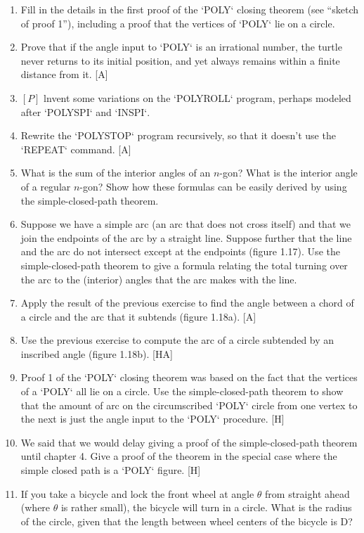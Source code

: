 \documentclass{book}
\begin{document}
\begin{enumerate}
\item Fill in the details in the first proof of the \textsc{`POLY`} closing theorem (see
``sketch of proof 1''), including a proof that the vertices of \textsc{`POLY`} lie on a
circle.  
\item Prove that if the angle input to \textsc{`POLY`} is an irrational number, the
turtle never returns to its initial position, and yet always remains within
a finite distance from it. [A]
\item $[P]$ lnvent some variations on the \textsc{`POLYROLL`} program, perhaps modeled
after \textsc{`POLYSPI`} and \textsc{`INSPI`}.
\item Rewrite the \textsc{`POLYSTOP`} program recursively, so that it doesn't use the
\textsc{`REPEAT`} command. [A]
\item What is the sum of the interior angles of an $n$-gon? What is the
interior angle of a regular $n$-gon? Show how these formulas can be easily
derived by using the simple-closed-path theorem.  
\item Suppose we have a simple arc (an arc that does not cross itself) and
that we join the endpoints of the arc by a straight line. Suppose further
that the line and the arc do not intersect except at the endpoints (figure
1.17).  Use the simple-closed-path theorem to give a formula relating the 
total turning over the arc to the (interior) angles that the arc makes with
the line.  
\item Apply the result of the previous exercise to find the angle between a
chord of a circle and the arc that it subtends (figure 1.18a). [A]
\item Use the previous exercise to compute the arc of a circle subtended by
an inscribed angle (figure 1.18b). [HA]
\item Proof 1 of the \textsc{`POLY`} closing theorem was based on the fact that the
vertices of a \textsc{`POLY`} all lie on a circle. Use the simple-closed-path theorem
to show that the amount of arc on the circumscribed \textsc{`POLY`} circle from
one vertex to the next is just the angle input to the \textsc{`POLY`} procedure. [H]
\item We said that we would delay giving a proof of the simple-closed-path
theorem until chapter 4. Give a proof of the theorem in the special case
where the simple closed path is a \textsc{`POLY`} figure. [H]
\item If you take a bicycle and lock the front wheel at angle $\theta$ from straight
ahead (where $\theta$ is rather small), the bicycle will turn in a circle. What
is the radius of the circle, given that the length between wheel centers
of the bicycle is D?  
\end{enumerate}
\end{document}
